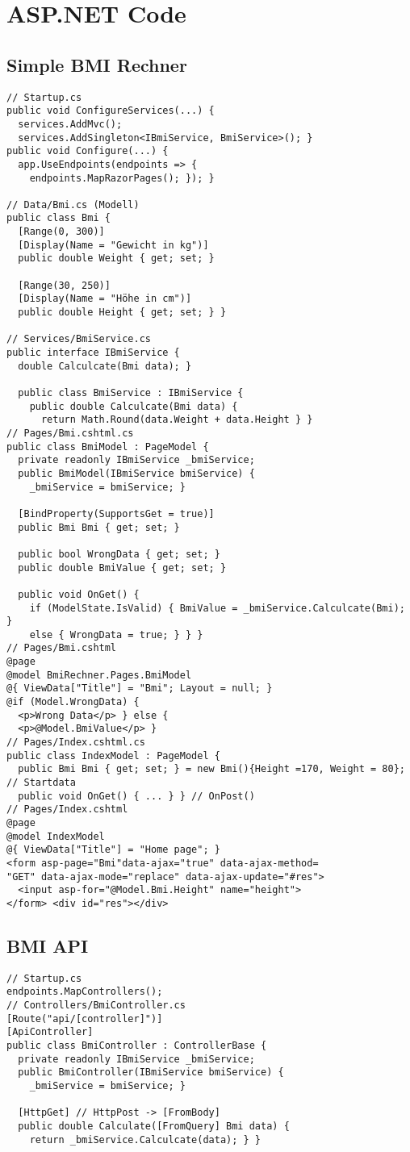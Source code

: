 \section{ASP.NET Code}
\subsection{Simple BMI Rechner}
\begin{lstlisting}[style=csh]
// Startup.cs
public void ConfigureServices(...) {
  services.AddMvc();
  services.AddSingleton<IBmiService, BmiService>(); }
public void Configure(...) {
  app.UseEndpoints(endpoints => {
    endpoints.MapRazorPages(); }); }

// Data/Bmi.cs (Modell)
public class Bmi {
  [Range(0, 300)]
  [Display(Name = "Gewicht in kg")]
  public double Weight { get; set; }

  [Range(30, 250)]
  [Display(Name = "Höhe in cm")]
  public double Height { get; set; } }

// Services/BmiService.cs
public interface IBmiService {
  double Calculcate(Bmi data); }

  public class BmiService : IBmiService {
    public double Calculcate(Bmi data) {
      return Math.Round(data.Weight + data.Height } }
// Pages/Bmi.cshtml.cs
public class BmiModel : PageModel {
  private readonly IBmiService _bmiService;
  public BmiModel(IBmiService bmiService) {
    _bmiService = bmiService; }

  [BindProperty(SupportsGet = true)]
  public Bmi Bmi { get; set; }

  public bool WrongData { get; set; }
  public double BmiValue { get; set; }

  public void OnGet() {
    if (ModelState.IsValid) { BmiValue = _bmiService.Calculcate(Bmi); }
    else { WrongData = true; } } }
// Pages/Bmi.cshtml
@page
@model BmiRechner.Pages.BmiModel
@{ ViewData["Title"] = "Bmi"; Layout = null; }
@if (Model.WrongData) {
  <p>Wrong Data</p> } else {
  <p>@Model.BmiValue</p> }
// Pages/Index.cshtml.cs
public class IndexModel : PageModel {
  public Bmi Bmi { get; set; } = new Bmi(){Height =170, Weight = 80}; // Startdata
  public void OnGet() { ... } } // OnPost()
// Pages/Index.cshtml
@page
@model IndexModel
@{ ViewData["Title"] = "Home page"; }
<form asp-page="Bmi"data-ajax="true" data-ajax-method=
"GET" data-ajax-mode="replace" data-ajax-update="#res">
  <input asp-for="@Model.Bmi.Height" name="height">
</form> <div id="res"></div>
\end{lstlisting}
\subsection{BMI API}
\begin{lstlisting}[style=csh]
// Startup.cs
endpoints.MapControllers();
// Controllers/BmiController.cs
[Route("api/[controller]")]
[ApiController]
public class BmiController : ControllerBase {
  private readonly IBmiService _bmiService;
  public BmiController(IBmiService bmiService) {
    _bmiService = bmiService; }

  [HttpGet] // HttpPost -> [FromBody]
  public double Calculate([FromQuery] Bmi data) {
    return _bmiService.Calculcate(data); } }
\end{lstlisting}